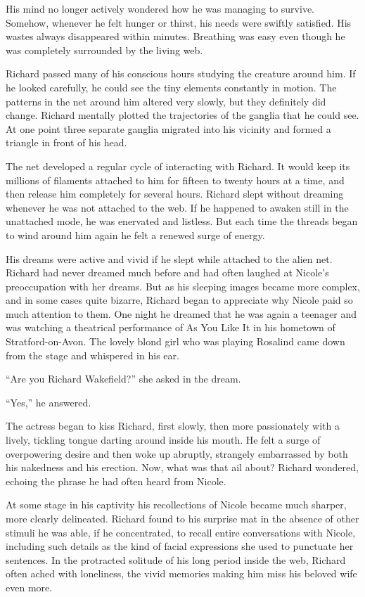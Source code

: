 \documentclass[]{article}
\begin{document}
{{His mind no longer actively wondered how he was managing to survive.  Somehow, whenever he felt hunger or thirst, his needs were swiftly satisfied.  His wastes always disappeared within minutes.  Breathing was easy even though he was completely surrounded by the living web.

Richard passed many of his conscious hours studying the creature around him.  If he looked carefully, he could see the tiny elements constantly in motion.  The patterns in the net around him altered very slowly, but they definitely did change.  Richard mentally plotted the trajectories of the ganglia that he could see.  At one point three separate ganglia migrated into his vicinity and formed a triangle in front of his head.

The net developed a regular cycle of interacting with Richard.  It would keep its millions of filaments attached to him for fifteen to twenty hours at a time, and then release him completely for several hours.  Richard slept without dreaming whenever he was not attached to the web.  If he happened to awaken still in the unattached mode, he was enervated and listless.  But each time the threads began to wind around him again he felt a renewed surge of energy.

His dreams were active and vivid if he slept while attached to the alien net.  Richard had never dreamed much before and had often laughed at Nicole’s preoccupation with her dreams.  But as his sleeping images became more complex, and in some cases quite bizarre, Richard began to appreciate why Nicole paid so much attention to them.  One night he dreamed that he was again a teenager and was watching a theatrical performance of As You Like It in his hometown of Stratford-on-Avon.  The lovely blond girl who was playing Rosalind came down from the stage and whispered in his ear.

“Are you Richard Wakefield?” she asked in the dream.

“Yes,” he answered.

The actress began to kiss Richard, first slowly, then more passionately with a lively, tickling tongue darting around inside his mouth.  He felt a surge of overpowering desire and then woke up abruptly, strangely embarrassed by both his nakedness and his erection.  Now, what was that ail about? Richard wondered, echoing the phrase he had often heard from Nicole.

At some stage in his captivity his recollections of Nicole became much sharper, more clearly delineated.  Richard found to his surprise mat in the absence of other stimuli he was able, if he concentrated, to recall entire conversations with Nicole, including such details as the kind of facial expressions she used to punctuate her sentences.  In the protracted solitude of his long period inside the web, Richard often ached with loneliness, the vivid memories making him miss his beloved wife even more.

}}
\end{document}
